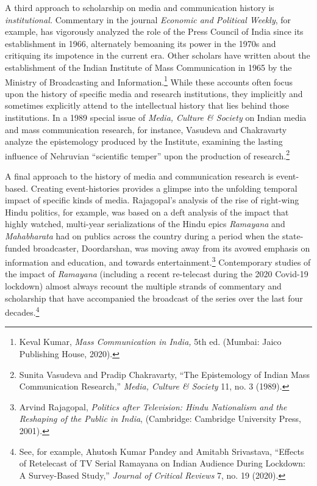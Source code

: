 \documentclass{tufte-handout}
\begin{document}
A third approach to scholarship on media and communication history is
\emph{institutional.} Commentary in the journal \emph{Economic and
Political Weekly}, for example, has vigorously analyzed the role of the
Press Council of India since its establishment in 1966, alternately
bemoaning its power in the 1970s and critiquing its impotence in the
current era. Other scholars have written about the establishment of the
Indian Institute of Mass Communication in 1965 by the Ministry of
Broadcasting and Information.\footnote{Keval Kumar, \emph{Mass
  Communication in India,} 5th ed. (Mumbai: Jaico Publishing House,
  2020).} While these accounts often focus upon the history of specific
media and research institutions, they implicitly and sometimes
explicitly attend to the intellectual history that lies behind those
institutions. In a 1989 special issue of \emph{Media, Culture \&
Society} on Indian media and mass communication research, for instance,
Vasudeva and Chakravarty analyze the epistemology produced by the
Institute, examining the lasting influence of Nehruvian ``scientific
temper'' upon the production of research.\footnote{Sunita Vasudeva and
  Pradip Chakravarty, ``The Epistemology of Indian Mass Communication
  Research,'' \emph{Media, Culture \& Society} 11, no. 3 (1989).}

A final approach to the history of media and communication research is
event-based. Creating event-histories provides a glimpse into the
unfolding temporal impact of specific kinds of media. Rajagopal's
analysis of the rise of right-wing Hindu politics, for example, was
based on a deft analysis of the impact that highly watched, multi-year
serializations of the Hindu epics \emph{Ramayana} and \emph{Mahabharata}
had on publics across the country during a period when the state-funded
broadcaster, Doordarshan, was moving away from its avowed emphasis on
information and education, and towards entertainment.\footnote{Arvind
  Rajagopal, \emph{Politics after Television: Hindu Nationalism and the
  Reshaping of the Public in India}, (Cambridge: Cambridge University
  Press, 2001).} Contemporary studies of the impact of \emph{Ramayana}
(including a recent re-telecast during the 2020 Covid-19 lockdown)
almost always recount the multiple strands of commentary and scholarship
that have accompanied the broadcast of the series over the last four
decades.\footnote{See, for example, Ahutosh Kumar Pandey and Amitabh
  Srivastava, ``Effects of Retelecast of TV Serial Ramayana on Indian
  Audience During Lockdown: A Survey-Based Study,'' \emph{Journal of
  Critical Reviews} 7, no. 19 (2020).}
\end{document}
